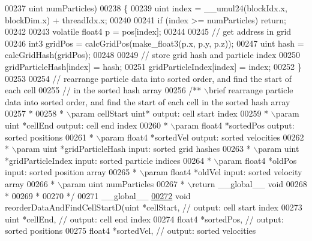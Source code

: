\begin{DoxyCode}
00237                uint    numParticles)
00238 \{
00239     uint index = \_\_umul24(blockIdx.x, blockDim.x) + threadIdx.x;
00240 
00241     \textcolor{keywordflow}{if} (index >= numParticles) \textcolor{keywordflow}{return};
00242 
00243     \textcolor{keyword}{volatile} float4 p = pos[index];
00244 
00245     \textcolor{comment}{// get address in grid}
00246     int3 gridPos = calcGridPos(make\_float3(p.x, p.y, p.z));
00247     uint hash = calcGridHash(gridPos);
00248 
00249     \textcolor{comment}{// store grid hash and particle index}
00250     gridParticleHash[index] = hash;
00251     gridParticleIndex[index] = index;
00252 \}
00253 
00254 \textcolor{comment}{// rearrange particle data into sorted order, and find the start of each cell}
00255 \textcolor{comment}{// in the sorted hash array}
00256 \textcolor{comment}{/** \(\backslash\)brief rearrange particle data into sorted order, and find the start of each cell in the sorted
       hash array}
00257 \textcolor{comment}{ *}
00258 \textcolor{comment}{ * \(\backslash\)param cellStart uint* output: cell start index}
00259 \textcolor{comment}{ * \(\backslash\)param uint   *cellEnd output: cell end index}
00260 \textcolor{comment}{ * \(\backslash\)param float4 *sortedPos output: sorted positions}
00261 \textcolor{comment}{ * \(\backslash\)param float4 *sortedVel output: sorted velocities}
00262 \textcolor{comment}{ * \(\backslash\)param uint   *gridParticleHash input: sorted grid hashes}
00263 \textcolor{comment}{ * \(\backslash\)param uint   *gridParticleIndex input: sorted particle indices}
00264 \textcolor{comment}{ * \(\backslash\)param float4 *oldPos input: sorted position array}
00265 \textcolor{comment}{ * \(\backslash\)param float4 *oldVel input: sorted velocity array}
00266 \textcolor{comment}{ * \(\backslash\)param uint    numParticles}
00267 \textcolor{comment}{ * \(\backslash\)return \_\_global\_\_ void}
00268 \textcolor{comment}{ *}
00269 \textcolor{comment}{ *}
00270 \textcolor{comment}{ */}
00271 \_\_global\_\_
\hypertarget{particles__kernel__impl_8cuh_source_l00272}{}\hyperlink{particles__kernel__impl_8cuh_abe84636059af3ed58ef603665395e6f4}{00272} \textcolor{keywordtype}{void} reorderDataAndFindCellStartD(uint   *cellStart,        \textcolor{comment}{// output: cell start index}
00273                                   uint   *cellEnd,          \textcolor{comment}{// output: cell end index}
00274                                   float4 *sortedPos,        \textcolor{comment}{// output: sorted positions}
00275                                   float4 *sortedVel,        \textcolor{comment}{// output: sorted velocities}

\end{DoxyCode}
